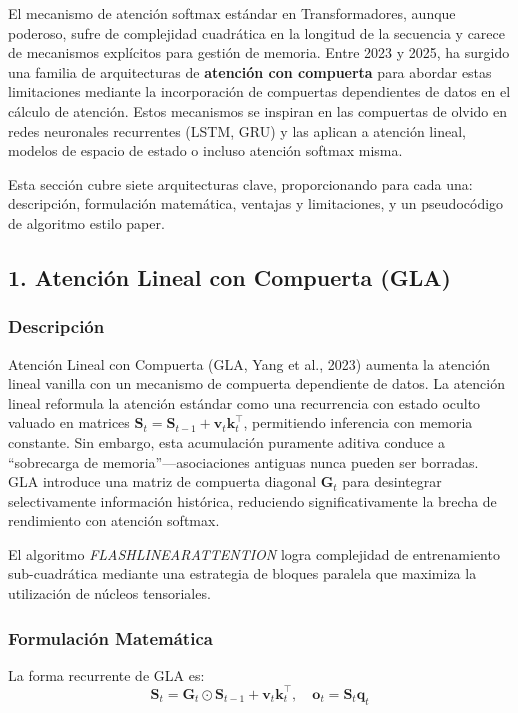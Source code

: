 \documentclass[11pt,a4paper]{article}
\begin{document}
El mecanismo de atención softmax estándar en Transformadores, aunque poderoso, sufre de complejidad cuadrática en la longitud de la secuencia y carece de mecanismos explícitos para gestión de memoria. Entre 2023 y 2025, ha surgido una familia de arquitecturas de \textbf{atención con compuerta} para abordar estas limitaciones mediante la incorporación de compuertas dependientes de datos en el cálculo de atención. Estos mecanismos se inspiran en las compuertas de olvido en redes neuronales recurrentes (LSTM, GRU) y las aplican a atención lineal, modelos de espacio de estado o incluso atención softmax misma.

Esta sección cubre siete arquitecturas clave, proporcionando para cada una: descripción, formulación matemática, ventajas y limitaciones, y un pseudocódigo de algoritmo estilo paper.

\subsection{1. Atención Lineal con Compuerta (GLA)}

\subsubsection{Descripción}

Atención Lineal con Compuerta (GLA, Yang et al., 2023) aumenta la atención lineal vanilla con un mecanismo de compuerta dependiente de datos. La atención lineal reformula la atención estándar como una recurrencia con estado oculto valuado en matrices $\mathbf{S}_t = \mathbf{S}_{t-1} + \mathbf{v}_t \mathbf{k}_t^\top$, permitiendo inferencia con memoria constante. Sin embargo, esta acumulación puramente aditiva conduce a ``sobrecarga de memoria''---asociaciones antiguas nunca pueden ser borradas. GLA introduce una matriz de compuerta diagonal $\mathbf{G}_t$ para desintegrar selectivamente información histórica, reduciendo significativamente la brecha de rendimiento con atención softmax.

El algoritmo \textit{FLASHLINEARATTENTION} logra complejidad de entrenamiento sub-cuadrática mediante una estrategia de bloques paralela que maximiza la utilización de núcleos tensoriales.

\subsubsection{Formulación Matemática}

La forma recurrente de GLA es:
\begin{equation}
\mathbf{S}_t = \mathbf{G}_t \odot \mathbf{S}_{t-1} + \mathbf{v}_t \mathbf{k}_t^\top, \quad \mathbf{o}_t = \mathbf{S}_t \mathbf{q}_t
\end{equation}
\end{document}
